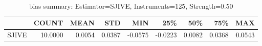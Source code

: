 \begin{table}[ht]
\centering
\caption{bias summary: Estimator=SJIVE, Instruments=125, Strength=0.50}
\begin{tabular}{lrrrrrrrr}
\toprule
 & COUNT & MEAN & STD & MIN & 25\% & 50\% & 75\% & MAX \\
\midrule
SJIVE & 10.0000 & 0.0054 & 0.0387 & -0.0575 & -0.0223 & 0.0082 & 0.0368 & 0.0543 \\
\bottomrule
\end{tabular}
\end{table}
